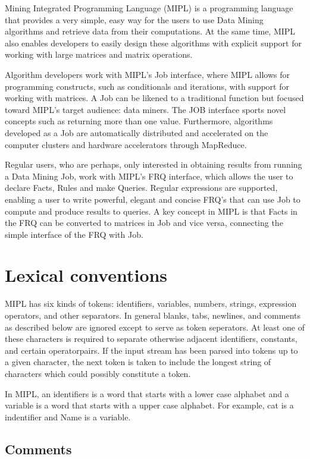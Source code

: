 \documentclass[prodmode,acmtecs]{acmsmall}
\begin{document}
Mining Integrated Programming Language (MIPL) is a programming language
that provides a very simple, easy way for the users to use Data Mining
algorithms and retrieve data from their computations. At the same time, 
MIPL also enables developers to easily design these algorithms with 
explicit support for working with large matrices and matrix operations.

Algorithm developers work with MIPL's Job interface, where MIPL allows
for programming constructs, such as conditionals and iterations, with
support for working with matrices. A Job can be likened to a traditional
function but focused toward MIPL's target audience: data miners. The JOB 
interface sports novel concepts such as returning more than one value.
Furthermore, algorithms developed as a Job are automatically distributed 
and accelerated on the computer clusters and hardware accelerators through
MapReduce. 

Regular users, who are perhaps, only interested in obtaining results from
running a Data Mining Job, work with MIPL's FRQ interface, which allows
the user to declare Facts, Rules and make Queries. Regular expressions are
supported, enabling a user to write powerful, elegant and concise FRQ's 
that can use Job to compute and produce results to queries. A key 
concept in MIPL is that Facts in the FRQ can be converted to matrices
in Job and vice versa, connecting the simple interface of the FRQ with
Job.

\medskip

\section{Lexical conventions}
MIPL has six kinds of tokens: identifiers, variables, numbers, strings,
expression operators, and other separators.  In general blanks, tabs,
newlines, and comments as described below are ignored except to
serve as token seperators. At least one of these characters is required
to separate otherwise adjacent identifiers, constants, and certain
operatorpairs.  If the input stream has been parsed into tokens up
to a given character, the next token is taken to include the longest
string of characters which could possibly constitute a token.

In MIPL, an identifiers is a word that starts with a lower case alphabet
and a variable is a word that starts with a upper case alphabet.  For
example, cat is a indentifier and Name is a variable.
\medskip

\subsection{Comments}
\end{document}
